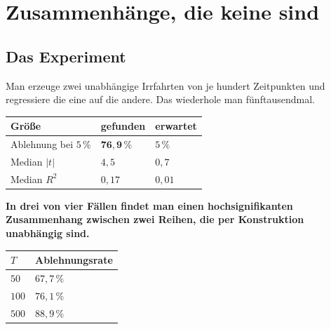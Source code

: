\chapter{Zusammenhänge, die keine sind}

\section{Das Experiment}

\begin{merksatz}
Man erzeuge zwei unabhängige Irrfahrten von je hundert Zeitpunkten und regressiere die eine auf die andere. Das wiederhole man fünftausendmal.

\begin{center}
{\small
\renewcommand{\arraystretch}{1.5}
\begin{tabular}{@{}P{3.6cm}P{2.4cm}P{2.2cm}@{}}
\toprule
\textbf{Größe} & \textbf{gefunden} & \textbf{erwartet}\\
\midrule
Ablehnung bei $5\,\%$ & $\mathbf{76{,}9\,\%}$ & $5\,\%$\\
Median $|t|$ & $4{,}5$ & $0{,}7$\\
Median $R^{2}$ & $0{,}17$ & $0{,}01$\\
\bottomrule
\end{tabular}}
\end{center}

\begin{center}
\begin{minipage}{0.9\textwidth}
\textbf{In drei von vier Fällen findet man einen hochsignifikanten Zusammenhang zwischen zwei Reihen, die per Konstruktion unabhängig sind.}
\end{minipage}
\end{center}

\begin{center}
{\small
\renewcommand{\arraystretch}{1.48}
\begin{tabular}{@{}P{1.6cm}P{2.6cm}@{}}
\toprule
$T$ & \textbf{Ablehnungsrate}\\
\midrule
$50$ & $67{,}7\,\%$\\
$100$ & $76{,}1\,\%$\\
$500$ & $88{,}9\,\%$\\
\bottomrule
\end{tabular}}
\end{center}

\begin{center}
\begin{minipage}{0.88\textwidth}
\end{minipage}
\end{center}
\end{merksatz}

